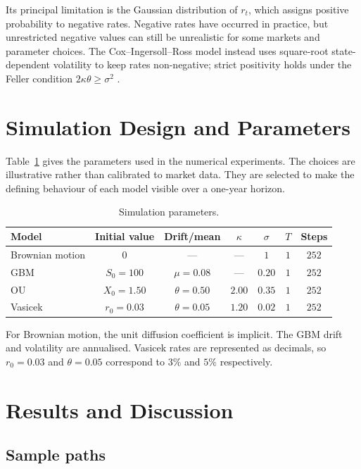 \documentclass[11pt,a4paper]{article}
\begin{document}
Its principal limitation is the Gaussian distribution of $r_t$, which assigns positive probability to negative rates. Negative rates have occurred in practice, but unrestricted negative values can still be unrealistic for some markets and parameter choices. The Cox--Ingersoll--Ross model instead uses square-root state-dependent volatility to keep rates non-negative; strict positivity holds under the Feller condition $2\kappa\theta\geq\sigma^2$ \cite{hull}.

\section{Simulation Design and Parameters}

Table~\ref{tab:parameters} gives the parameters used in the numerical experiments. The choices are illustrative rather than calibrated to market data. They are selected to make the defining behaviour of each model visible over a one-year horizon.

\begin{table}[htbp]
\centering
\caption{Simulation parameters.}
\label{tab:parameters}
\begin{tabular}{lcccccc}
\toprule
Model & Initial value & Drift/mean & $\kappa$ & $\sigma$ & $T$ & Steps\\
\midrule
Brownian motion & $0$ & --- & --- & $1$ & $1$ & $252$\\
GBM & $S_0=100$ & $\mu=0.08$ & --- & $0.20$ & $1$ & $252$\\
OU & $X_0=1.50$ & $\theta=0.50$ & $2.00$ & $0.35$ & $1$ & $252$\\
Vasicek & $r_0=0.03$ & $\theta=0.05$ & $1.20$ & $0.02$ & $1$ & $252$\\
\bottomrule
\end{tabular}
\end{table}

For Brownian motion, the unit diffusion coefficient is implicit. The GBM drift and volatility are annualised. Vasicek rates are represented as decimals, so $r_0=0.03$ and $\theta=0.05$ correspond to $3\%$ and $5\%$ respectively.

\section{Results and Discussion}

\subsection{Sample paths}
\end{document}

